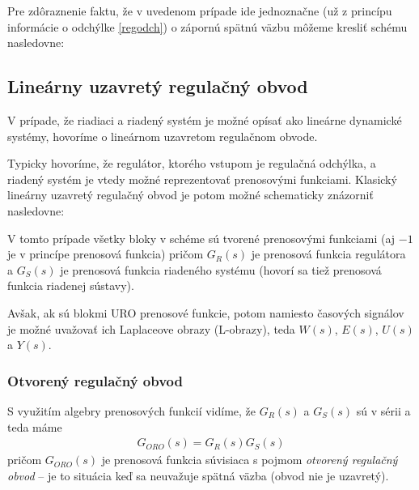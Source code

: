 \documentclass[a4paper, 10pt, ]{article}
\begin{document}
Pre zdôraznenie faktu, že v uvedenom prípade ide jednoznačne (už z princípu informácie o odchýlke \eqref{regodch}) o zápornú spätnú väzbu môžeme kresliť schému nasledovne:

\begin{center}


	\label{schURO_regodchminus.pdf}

\end{center}




\subsection{Lineárny uzavretý regulačný obvod}

V prípade, že riadiaci a riadený systém je možné opísať ako lineárne dynamické systémy, hovoríme o lineárnom uzavretom regulačnom obvode.

Typicky hovoríme, že regulátor, ktorého vstupom je regulačná odchýlka, a riadený systém je vtedy možné reprezentovať prenosovými funkciami. Klasický lineárny uzavretý regulačný obvod je potom možné schematicky znázorniť nasledovne:

\begin{center}


	\label{schLinURO_basic.pdf}

\end{center}

V tomto prípade všetky bloky v schéme sú tvorené prenosovými funkciami (aj $-1$ je v princípe prenosová funkcia) pričom $G_R(s)$ je prenosová funkcia regulátora a  $G_S(s)$ je prenosová funkcia riadeného systému (hovorí sa tiež prenosová funkcia riadenej sústavy).

Avšak, ak sú blokmi URO prenosové funkcie, potom namiesto časových signálov je možné uvažovať ich Laplaceove obrazy (L-obrazy), teda $W(s)$, $E(s)$, $U(s)$ a $Y(s)$.


\subsubsection{Otvorený regulačný obvod}

S využitím algebry prenosových funkcií vidíme, že $G_R(s)$ a $G_S(s)$ sú v sérii a teda máme
\begin{align}
    G_{ORO}(s) = G_R(s) G_S(s)
\end{align}
pričom $G_{ORO}(s)$ je prenosová funkcia súvisiaca s pojmom \emph{otvorený regulačný obvod} -- je to situácia keď sa neuvažuje spätná väzba (obvod nie je uzavretý).
\end{document}
